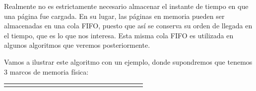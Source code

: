 Realmente no es estrictamente necesario almacenar el instante de tiempo
en que una página fue cargada. En su lugar, las páginas en memoria
pueden ser almacenadas en una cola FIFO, puesto que así se conserva su
orden de llegada en el tiempo, que es lo que nos interesa. Esta misma
cola FIFO es utilizada en algunos algoritmos que veremos posteriormente.

Vamos a ilustrar este algoritmo con un ejemplo, donde supondremos que
tenemos 3 marcos de memoria física:

\begin{longtable}[]{@{}
  >{\raggedright\arraybackslash}p{}
  >{\raggedright\arraybackslash}p{}
  >{\raggedright\arraybackslash}p{}
  >{\raggedright\arraybackslash}p{}
  >{\raggedright\arraybackslash}p{}
  >{\raggedright\arraybackslash}p{}
  >{\raggedright\arraybackslash}p{}
  >{\raggedright\arraybackslash}p{}
  >{\raggedright\arraybackslash}p{}
  >{\raggedright\arraybackslash}p{}
  >{\raggedright\arraybackslash}p{}
  >{\raggedright\arraybackslash}p{}
  >{\raggedright\arraybackslash}p{}
  >{\raggedright\arraybackslash}p{}
  >{\raggedright\arraybackslash}p{}
  >{\raggedright\arraybackslash}p{}
  >{\raggedright\arraybackslash}p{}
  >{\raggedright\arraybackslash}p{}
  >{\raggedright\arraybackslash}p{}
  >{\raggedright\arraybackslash}p{}@{}}
\toprule\noalign{}
\begin{minipage}[b]{\linewidth}\centering
7
\end{minipage} & \begin{minipage}[b]{\linewidth}\centering
0
\end{minipage} & \begin{minipage}[b]{\linewidth}\centering
1
\end{minipage} & \begin{minipage}[b]{\linewidth}\centering

\end{minipage}
\end{longtable}
